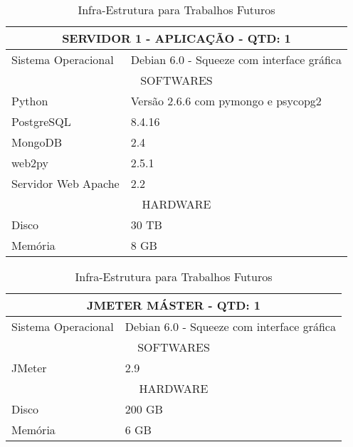 \begin{table}[h]
	\caption{Infra-Estrutura para Trabalhos Futuros}
	\begin{center}
	\begin{tabular} {|l|l|}
		\hline
			\multicolumn{2}{|c|}{SERVIDOR 1 - APLICAÇÃO - QTD: 1} \\
		\hline
			Sistema Operacional & Debian 6.0 - Squeeze com interface gráfica \\
		\hline
			\multicolumn{2}{|c|}{SOFTWARES}\\
		\hline
			Python & Versão 2.6.6 com pymongo e psycopg2\\
		\hline
			PostgreSQL & 8.4.16\\
		\hline
			MongoDB & 2.4\\
		\hline
			web2py & 2.5.1\\
		\hline
			Servidor Web Apache & 2.2\\
		\hline
			\multicolumn{2}{|c|}{HARDWARE}\\
		\hline
			Disco & 30 TB\\
		\hline
			Memória & 8 GB\\
		\hline
	\end {tabular}
	\end{center}
	\label{tab:infra1}
\end{table}

\begin{table}[h]
	\caption{Infra-Estrutura para Trabalhos Futuros}
	\begin{center}
	\begin{tabular} {|l|l|}
		\hline
			\multicolumn{2}{|c|}{JMETER MÁSTER - QTD: 1} \\
		\hline
			Sistema Operacional & Debian 6.0 - Squeeze com interface gráfica \\
		\hline
			\multicolumn{2}{|c|}{SOFTWARES}\\
		\hline
			JMeter & 2.9\\
		\hline
			\multicolumn{2}{|c|}{HARDWARE}\\
		\hline
			Disco & 200 GB\\
		\hline
			Memória & 6 GB\\
		\hline
	\end {tabular}
	\end{center}
	\label{tab:infra2}
\end{table}


